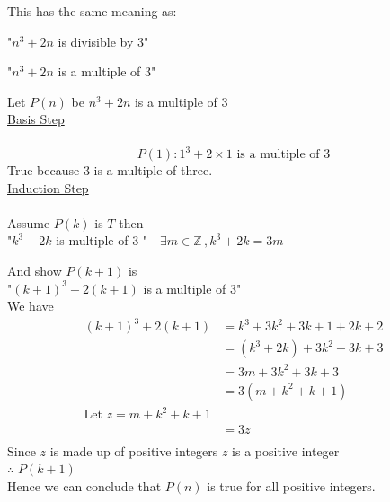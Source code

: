 \documentclass[12pt letter]{report}
\begin{document}
\begin{myproof}

  This has the same meaning as:

  "$n^3 + 2n$ is divisible by 3"

  "$n^3 + 2n$ is a multiple of 3"

  Let $P \left( n \right) $ be $n^3 +2n$ is a multiple of 3 \\

  \noindent \underline{Basis Step} \\
  \\

  \[
    P \left( 1 \right) : 1^3 + 2 \times  1 \text{ is a multiple of 3}
  \]
  True because 3 is a multiple of three. \\

  \noindent \underline{Induction  Step} \\
  \\
  Assume $P \left( k \right) $ is $T$ then \\

  "$k^3 + 2k$ is multiple of 3 " -  $\exists m \in \mathbb{Z} \, , k^3 + 2k = 3m $


  \noindent And show $P \left( k + 1 \right) $ is \\

  "$\left( k + 1 \right)^3 + 2 \left( k + 1 \right)  $ is a multiple of 3" \\


  \noindent   We have \\
  \begin{align*}
    \left( k + 1 \right) ^3 + 2 \left( k + 1 \right) & = k^3 + 3k^2 + 3k + 1 + 2k + 2            \\
                                                     & = \left( k^3 + 2k \right) + 3k^2 + 3k + 3 \\
                                                     & = 3m + 3k^2 + 3k + 3                      \\
                                                     & = 3 \left( m + k^2 + k + 1 \right)        \\
    \text{Let } z = m + k^2 + k + 1                                                              \\
                                                     & = 3z                                      \\
  \end{align*}
  Since $z$ is made up of positive integers $z$ is a positive integer\\
  $\therefore$ $P \left( k + 1 \right) $\\
  Hence we can conclude that $P \left( n \right) $ is true for all positive integers.


\end{myproof}
\end{document}

